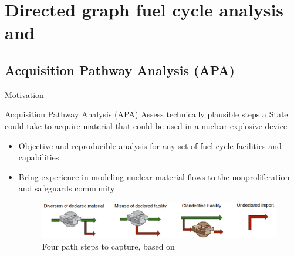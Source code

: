 
\section{Directed graph fuel cycle analysis and \Cyclus}
\subsection{Acquisition Pathway Analysis (APA)}

\begin{frame}{Motivation}
\begin{block}{Acquisition Pathway Analysis (APA)} Assess technically plausible steps a State could take to acquire material that could be used in a nuclear explosive device \cite{amano_conceptualization_2013}
\end{block}
  \begin{itemize}
  \medskip
    \item Objective and reproducible analysis for any set of fuel cycle facilities and capabilities
  \item Bring experience in modeling nuclear material flows to the nonproliferation and safeguards community
    \bigskip
    \begin{figure}
        \centering
        \includegraphics[width=0.95\linewidth]{images/path_step_types.png}
        \caption{Four path steps to capture, based on \cite{renis_conducting_2014}}
        \label{fig:path_steps}
    \end{figure}

  \end{itemize}

\end{frame}


